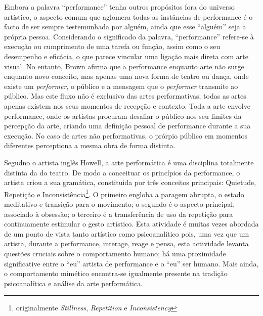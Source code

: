 \documentclass[../main.tex]{subfiles}
\begin{document}
Embora a palavra \enquote{performance} tenha outros propósitos fora do universo artístico, o aspecto comum que aglomera todas as instâncias de performance é o facto de ser sempre testemunhada por alguém, ainda que esse \enquote{alguém} seja a própria pessoa\cite{carlson1996}. Considerando o significado da palavra, \enquote{performance} refere-se à execução ou cumprimento de uma tarefa ou função, assim como o seu desempenho e eficácia\cite{oxford}, o que parece vincular uma ligação mais direta com arte visual\cite{brisley}. No entanto, Brown afirma que a performance enquanto arte não surge enquanto novo conceito, mas apenas uma nova forma de teatro ou dança, onde existe um \textsl{performer}, o público e a mensagem que o \textsl{performer} transmite ao público\cite{brown_battcock}. Mas este fluxo não é exclusivo das artes performativas; todas as artes apenas existem nos seus momentos de recepção e contexto\cite{gadamer}. Toda a arte envolve performance\cite{brisley}, onde os artistas procuram desafiar o público nos seu limites da percepção da arte, criando uma definição pessoal de performance durante a sua execução\cite{goldberg_battcock}. No caso de artes não performativas, o prórpio público em momentos diferentes perceptiona a mesma obra de forma distinta\cite{gadamer}.

Segudno o artista inglês Howell, a arte performática é uma disciplina totalmente distinta da do teatro\cite{howell1999}. De modo a conceituar os princípios da performance, o artista criou a sua gramática, constituida por três conceitos principais: Quietude, Repetição e Inconsistência\footnote{originalmente \textit{Stillness}, \textit{Repetition} e \textit{Inconsistency}}. O primeiro engloba a paragem abrupta, o estado meditativo e transição para o movimento; o segundo é o aspecto principal, associado à obsessão; o terceiro é a transferência de uso da repetição para continuamente estimular o gesto artístico. Esta atividade é muitas vezes abordada de um ponto de vista tanto artístico como psicoanalítico pois, uma vez que um artista, durante a performance, interage, reage e pensa, esta actividade levanta questões cruciais sobre o comportamento humano\cite{kear}; há uma proximidade significative entre o \enquote{eu} artista de performance e o \enquote{eu} ser humano\cite{carlson1996}. Mais ainda, o comportamento mimético encontra-se igualmente presente na tradição psicoanalítica e análise da arte performática\cite{howell1999,read}.

\end{document}
